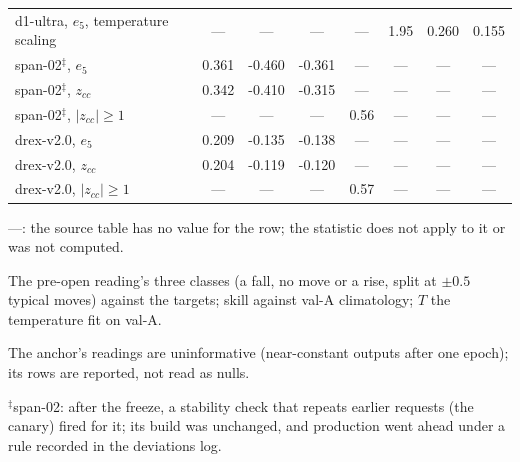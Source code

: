 \begin{table}[htbp]
\begin{threeparttable}
\begin{tabular}{@{}>{\raggedright\arraybackslash}p{1.6in}S[table-format=1.3]S[table-format=-1.3]S[table-format=-1.3]S[table-format=1.2]S[table-format=1.2]S[table-format=1.3]S[table-format=1.3]@{}}
d1-ultra, $e_5$, temperature scaling & {---} & {---} & {---} & {---} & 1.95 & 0.260 & 0.155 \\
span-02$^{\ddagger}$, $e_5$ & 0.361 & -0.460 & -0.361 & {---} & {---} & {---} & {---} \\
span-02$^{\ddagger}$, $z_{cc}$ & 0.342 & -0.410 & -0.315 & {---} & {---} & {---} & {---} \\
span-02$^{\ddagger}$, $|z_{cc}| \geq 1$ & {---} & {---} & {---} & 0.56 & {---} & {---} & {---} \\
drex-v2.0, $e_5$ & 0.209 & -0.135 & -0.138 & {---} & {---} & {---} & {---} \\
drex-v2.0, $z_{cc}$ & 0.204 & -0.119 & -0.120 & {---} & {---} & {---} & {---} \\
drex-v2.0, $|z_{cc}| \geq 1$ & {---} & {---} & {---} & 0.57 & {---} & {---} & {---} \\
\bottomrule
\end{tabular}
\begin{tablenotes}[flushleft]\footnotesize
\item ---: the source table has no value for the row; the statistic does not apply to it or was not computed.
\item The pre-open reading's three classes (a fall, no move or a rise, split at $\pm 0.5$ typical moves) against the targets; skill against val-A climatology; $T$ the temperature fit on val-A.
\item The anchor's readings are uninformative (near-constant outputs after one epoch); its rows are reported, not read as nulls.
\item $^{\ddagger}$span-02: after the freeze, a stability check that repeats earlier requests (the canary) fired for it; its build was unchanged, and production went ahead under a rule recorded in the deviations log.
\end{tablenotes}
\end{threeparttable}
\end{table}
